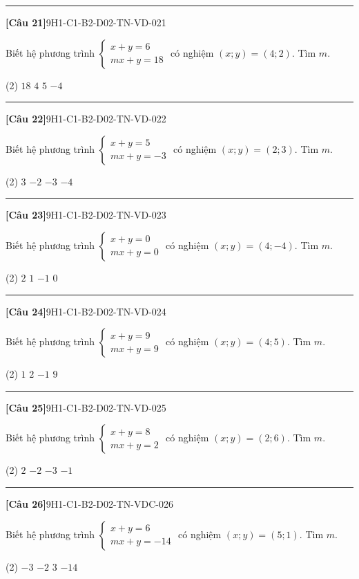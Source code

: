 \documentclass[12pt,a4paper]{article}
\newif\ifloigiai
\newenvironment{cauhoi}[2]{%
  \par\medskip\noindent\rule{\textwidth}{0.4pt}\par\nopagebreak
  \noindent\textbf{[#1]}\hfill{\scriptsize\ttfamily #2}\par\nopagebreak\smallskip}{\par}
\newcommand{\dapan}[1]{\ifloigiai\par\smallskip\noindent\textit{Đáp án:} \textbf{#1}\par\fi}
\begin{document}
\begin{cauhoi}{Câu 21}{9H1-C1-B2-D02-TN-VD-021}
Biết hệ phương trình $\begin{cases}x+y=6\\ mx+y=18\end{cases}$ có nghiệm $(x;y)=(4;2)$. Tìm $m$.
\begin{tasks}(2)
\task $18$
\task $4$
\task $5$
\task $-4$
\end{tasks}
\dapan{B}
\end{cauhoi}
\begin{cauhoi}{Câu 22}{9H1-C1-B2-D02-TN-VD-022}
Biết hệ phương trình $\begin{cases}x+y=5\\ mx+y=-3\end{cases}$ có nghiệm $(x;y)=(2;3)$. Tìm $m$.
\begin{tasks}(2)
\task $3$
\task $-2$
\task $-3$
\task $-4$
\end{tasks}
\dapan{C}
\end{cauhoi}
\begin{cauhoi}{Câu 23}{9H1-C1-B2-D02-TN-VD-023}
Biết hệ phương trình $\begin{cases}x+y=0\\ mx+y=0\end{cases}$ có nghiệm $(x;y)=(4;-4)$. Tìm $m$.
\begin{tasks}(2)
\task $2$
\task $1$
\task $-1$
\task $0$
\end{tasks}
\dapan{B}
\end{cauhoi}
\begin{cauhoi}{Câu 24}{9H1-C1-B2-D02-TN-VD-024}
Biết hệ phương trình $\begin{cases}x+y=9\\ mx+y=9\end{cases}$ có nghiệm $(x;y)=(4;5)$. Tìm $m$.
\begin{tasks}(2)
\task $1$
\task $2$
\task $-1$
\task $9$
\end{tasks}
\dapan{A}
\end{cauhoi}
\begin{cauhoi}{Câu 25}{9H1-C1-B2-D02-TN-VD-025}
Biết hệ phương trình $\begin{cases}x+y=8\\ mx+y=2\end{cases}$ có nghiệm $(x;y)=(2;6)$. Tìm $m$.
\begin{tasks}(2)
\task $2$
\task $-2$
\task $-3$
\task $-1$
\end{tasks}
\dapan{B}
\end{cauhoi}
\begin{cauhoi}{Câu 26}{9H1-C1-B2-D02-TN-VDC-026}
Biết hệ phương trình $\begin{cases}x+y=6\\ mx+y=-14\end{cases}$ có nghiệm $(x;y)=(5;1)$. Tìm $m$.
\begin{tasks}(2)
\task $-3$
\task $-2$
\task $3$
\task $-14$
\end{tasks}
\dapan{A}
\end{cauhoi}
\end{document}
